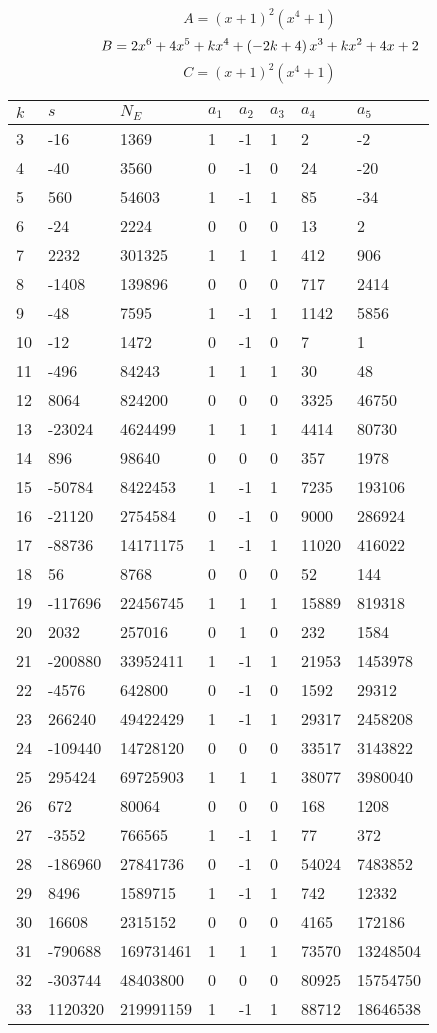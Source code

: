 \documentclass{amsart}
\begin{document}
$$A=(x
 + 1)^{2}(x^4
 + 1)$$
$$B=2\*x^6
 + 4\*x^5
 + k\*x^4
 + \left(-2\*k
 + 4\right) \*x^3
 + k\*x^2
 + 4\*x
 + 2$$
$$C=(x
 + 1)^{2}(x^4
 + 1)$$
\begin{longtable}{|l|l|l|lllll|}
\hline
$k$ & $s$ & $N_E$ & $a_1$ & $a_2$ & $a_3$ & $a_4$ & $a_5$\\
\hline
3&-16&1369&1&-1&1&2&-2\\
4&-40&3560&0&-1&0&24&-20\\
5&560&54603&1&-1&1&85&-34\\
6&-24&2224&0&0&0&13&2\\
7&2232&301325&1&1&1&412&906\\
8&-1408&139896&0&0&0&717&2414\\
9&-48&7595&1&-1&1&1142&5856\\
10&-12&1472&0&-1&0&7&1\\
11&-496&84243&1&1&1&30&48\\
12&8064&824200&0&0&0&3325&46750\\
13&-23024&4624499&1&1&1&4414&80730\\
14&896&98640&0&0&0&357&1978\\
15&-50784&8422453&1&-1&1&7235&193106\\
16&-21120&2754584&0&-1&0&9000&286924\\
17&-88736&14171175&1&-1&1&11020&416022\\
18&56&8768&0&0&0&52&144\\
19&-117696&22456745&1&1&1&15889&819318\\
20&2032&257016&0&1&0&232&1584\\
21&-200880&33952411&1&-1&1&21953&1453978\\
22&-4576&642800&0&-1&0&1592&29312\\
23&266240&49422429&1&-1&1&29317&2458208\\
24&-109440&14728120&0&0&0&33517&3143822\\
25&295424&69725903&1&1&1&38077&3980040\\
26&672&80064&0&0&0&168&1208\\
27&-3552&766565&1&-1&1&77&372\\
28&-186960&27841736&0&-1&0&54024&7483852\\
29&8496&1589715&1&-1&1&742&12332\\
30&16608&2315152&0&0&0&4165&172186\\
31&-790688&169731461&1&1&1&73570&13248504\\
32&-303744&48403800&0&0&0&80925&15754750\\
33&1120320&219991159&1&-1&1&88712&18646538\\

\end{longtable}
\end{document}
